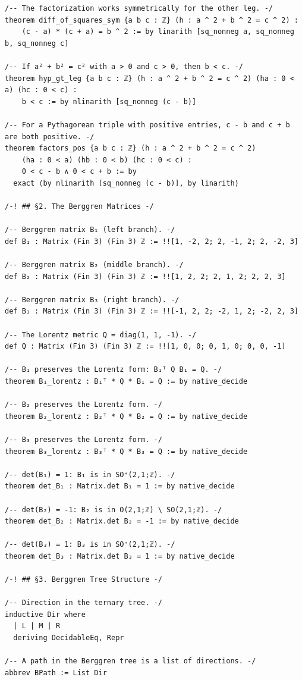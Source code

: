 \documentclass[11pt,openany]{book}
\theoremstyle{definition}
\theoremstyle{plain}
\theoremstyle{remark}
\begin{document}
\begin{lstlisting}[style=lean]
/-- The factorization works symmetrically for the other leg. -/
theorem diff_of_squares_sym {a b c : ℤ} (h : a ^ 2 + b ^ 2 = c ^ 2) :
    (c - a) * (c + a) = b ^ 2 := by linarith [sq_nonneg a, sq_nonneg b, sq_nonneg c]

/-- If a² + b² = c² with a > 0 and c > 0, then b < c. -/
theorem hyp_gt_leg {a b c : ℤ} (h : a ^ 2 + b ^ 2 = c ^ 2) (ha : 0 < a) (hc : 0 < c) :
    b < c := by nlinarith [sq_nonneg (c - b)]

/-- For a Pythagorean triple with positive entries, c - b and c + b are both positive. -/
theorem factors_pos {a b c : ℤ} (h : a ^ 2 + b ^ 2 = c ^ 2)
    (ha : 0 < a) (hb : 0 < b) (hc : 0 < c) :
    0 < c - b ∧ 0 < c + b := by
  exact ⟨by nlinarith [sq_nonneg (c - b)], by linarith⟩

/-! ## §2. The Berggren Matrices -/

/-- Berggren matrix B₁ (left branch). -/
def B₁ : Matrix (Fin 3) (Fin 3) ℤ := !![1, -2, 2; 2, -1, 2; 2, -2, 3]

/-- Berggren matrix B₂ (middle branch). -/
def B₂ : Matrix (Fin 3) (Fin 3) ℤ := !![1, 2, 2; 2, 1, 2; 2, 2, 3]

/-- Berggren matrix B₃ (right branch). -/
def B₃ : Matrix (Fin 3) (Fin 3) ℤ := !![-1, 2, 2; -2, 1, 2; -2, 2, 3]

/-- The Lorentz metric Q = diag(1, 1, -1). -/
def Q : Matrix (Fin 3) (Fin 3) ℤ := !![1, 0, 0; 0, 1, 0; 0, 0, -1]

/-- B₁ preserves the Lorentz form: B₁ᵀ Q B₁ = Q. -/
theorem B₁_lorentz : B₁ᵀ * Q * B₁ = Q := by native_decide

/-- B₂ preserves the Lorentz form. -/
theorem B₂_lorentz : B₂ᵀ * Q * B₂ = Q := by native_decide

/-- B₃ preserves the Lorentz form. -/
theorem B₃_lorentz : B₃ᵀ * Q * B₃ = Q := by native_decide

/-- det(B₁) = 1: B₁ is in SO⁺(2,1;ℤ). -/
theorem det_B₁ : Matrix.det B₁ = 1 := by native_decide

/-- det(B₂) = -1: B₂ is in O(2,1;ℤ) \ SO(2,1;ℤ). -/
theorem det_B₂ : Matrix.det B₂ = -1 := by native_decide

/-- det(B₃) = 1: B₃ is in SO⁺(2,1;ℤ). -/
theorem det_B₃ : Matrix.det B₃ = 1 := by native_decide

/-! ## §3. Berggren Tree Structure -/

/-- Direction in the ternary tree. -/
inductive Dir where
  | L | M | R
  deriving DecidableEq, Repr

/-- A path in the Berggren tree is a list of directions. -/
abbrev BPath := List Dir


\end{lstlisting}
\end{document}
